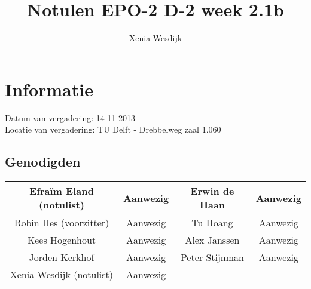 \documentclass{article}
\begin{document}
\title{Notulen EPO-2 D-2 week 2.1b }%
\author{Xenia Wesdijk}%
\maketitle

\section*{Informatie}
Datum van vergadering: 14-11-2013\\ %
Locatie van vergadering: TU Delft - Drebbelweg zaal 1.060 %
\subsection*{Genodigden}
\begin{center}
\begin{tabular}{|c |c | c| c|}
	\hline
Efraïm Eland (notulist) & Aanwezig & Erwin de Haan & Aanwezig \\
	\hline
Robin Hes (voorzitter) & Aanwezig & Tu Hoang & Aanwezig \\
	\hline
Kees Hogenhout & Aanwezig & Alex Janssen & Aanwezig\\
	\hline
Jorden Kerkhof & Aanwezig & Peter Stijnman & Aanwezig \\
	\hline
Xenia Wesdijk (notulist) & Aanwezig & & \\
	\hline
\end{tabular}
\end{center}
\end{document}
